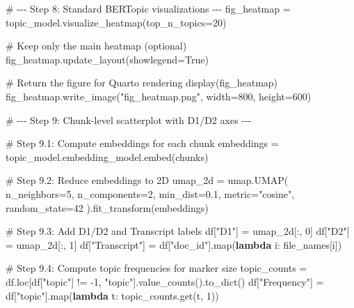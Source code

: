 \documentclass[
  letterpaper,
  DIV=11,
  numbers=noendperiod]{scrartcl}
\newenvironment{Shaded}{\begin{snugshade}}{\end{snugshade}}
\newcommand{\BuiltInTok}[1]{\textcolor[rgb]{0.00,0.23,0.31}{#1}}
\newcommand{\CommentTok}[1]{\textcolor[rgb]{0.37,0.37,0.37}{#1}}
\newcommand{\DecValTok}[1]{\textcolor[rgb]{0.68,0.00,0.00}{#1}}
\newcommand{\FloatTok}[1]{\textcolor[rgb]{0.68,0.00,0.00}{#1}}
\newcommand{\KeywordTok}[1]{\textcolor[rgb]{0.00,0.23,0.31}{\textbf{#1}}}
\newcommand{\NormalTok}[1]{\textcolor[rgb]{0.00,0.23,0.31}{#1}}
\newcommand{\OperatorTok}[1]{\textcolor[rgb]{0.37,0.37,0.37}{#1}}
\newcommand{\StringTok}[1]{\textcolor[rgb]{0.13,0.47,0.30}{#1}}
\newcommand{\VariableTok}[1]{\textcolor[rgb]{0.07,0.07,0.07}{#1}}
\begin{document}
\begin{Shaded}
\begin{Highlighting}[]
\CommentTok{\# {-}{-}{-} Step 8: Standard BERTopic visualizations {-}{-}{-}}
\NormalTok{fig\_heatmap }\OperatorTok{=}\NormalTok{ topic\_model.visualize\_heatmap(top\_n\_topics}\OperatorTok{=}\DecValTok{20}\NormalTok{)}

\CommentTok{\# Keep only the main heatmap (optional)}
\NormalTok{fig\_heatmap.update\_layout(showlegend}\OperatorTok{=}\VariableTok{True}\NormalTok{)  }

\CommentTok{\# Return the figure for Quarto rendering}
\NormalTok{display(fig\_heatmap)}
\NormalTok{fig\_heatmap.write\_image(}\StringTok{"fig\_heatmap.png"}\NormalTok{, width}\OperatorTok{=}\DecValTok{800}\NormalTok{, height}\OperatorTok{=}\DecValTok{600}\NormalTok{)}

\CommentTok{\# {-}{-}{-} Step 9: Chunk{-}level scatterplot with D1/D2 axes {-}{-}{-}}

\CommentTok{\# Step 9.1: Compute embeddings for each chunk}
\NormalTok{embeddings }\OperatorTok{=}\NormalTok{ topic\_model.embedding\_model.embed(chunks)}

\CommentTok{\# Step 9.2: Reduce embeddings to 2D}
\NormalTok{umap\_2d }\OperatorTok{=}\NormalTok{ umap.UMAP(}
\NormalTok{    n\_neighbors}\OperatorTok{=}\DecValTok{5}\NormalTok{,}
\NormalTok{    n\_components}\OperatorTok{=}\DecValTok{2}\NormalTok{,}
\NormalTok{    min\_dist}\OperatorTok{=}\FloatTok{0.1}\NormalTok{,}
\NormalTok{    metric}\OperatorTok{=}\StringTok{"cosine"}\NormalTok{,}
\NormalTok{    random\_state}\OperatorTok{=}\DecValTok{42}
\NormalTok{).fit\_transform(embeddings)}

\CommentTok{\# Step 9.3: Add D1/D2 and Transcript labels}
\NormalTok{df[}\StringTok{"D1"}\NormalTok{] }\OperatorTok{=}\NormalTok{ umap\_2d[:, }\DecValTok{0}\NormalTok{]}
\NormalTok{df[}\StringTok{"D2"}\NormalTok{] }\OperatorTok{=}\NormalTok{ umap\_2d[:, }\DecValTok{1}\NormalTok{]}
\NormalTok{df[}\StringTok{"Transcript"}\NormalTok{] }\OperatorTok{=}\NormalTok{ df[}\StringTok{"doc\_id"}\NormalTok{].}\BuiltInTok{map}\NormalTok{(}\KeywordTok{lambda}\NormalTok{ i: file\_names[i])}

\CommentTok{\# Step 9.4: Compute topic frequencies for marker size}
\NormalTok{topic\_counts }\OperatorTok{=}\NormalTok{ df.loc[df[}\StringTok{"topic"}\NormalTok{] }\OperatorTok{!=} \OperatorTok{{-}}\DecValTok{1}\NormalTok{, }\StringTok{"topic"}\NormalTok{].value\_counts().to\_dict()}
\NormalTok{df[}\StringTok{"Frequency"}\NormalTok{] }\OperatorTok{=}\NormalTok{ df[}\StringTok{"topic"}\NormalTok{].}\BuiltInTok{map}\NormalTok{(}\KeywordTok{lambda}\NormalTok{ t: topic\_counts.get(t, }\DecValTok{1}\NormalTok{))}


\end{Highlighting}
\end{Shaded}
\end{document}
